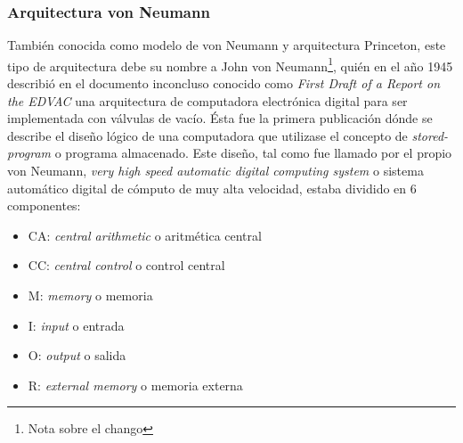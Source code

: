\subsubsection{Arquitectura von Neumann}

También conocida como modelo de von Neumann y arquitectura Princeton, este tipo de arquitectura debe su nombre a John von Neumann\footnote{Nota sobre el chango}, quién en el año 1945 describió en el documento inconcluso conocido como \emph{First Draft of a Report on the EDVAC}\cite{vonNeumann} una arquitectura de computadora electrónica digital para ser implementada con válvulas de vacío. Ésta fue la primera publicación dónde se describe el diseño lógico de una computadora que utilizase el concepto de \emph{stored-program} o programa almacenado. Este diseño, tal como fue llamado por el propio von Neumann, \emph{very high speed automatic digital computing system} o sistema automático digital de cómputo de muy alta velocidad, estaba dividido en 6 componentes:
\begin{itemize}
  \item CA: \emph{central arithmetic} o aritmética central
  \item CC: \emph{central control} o control central
  \item M: \emph{memory} o memoria
  \item I: \emph{input} o entrada
  \item O: \emph{output} o salida
  \item R: \emph{external memory} o memoria externa
\end{itemize}
